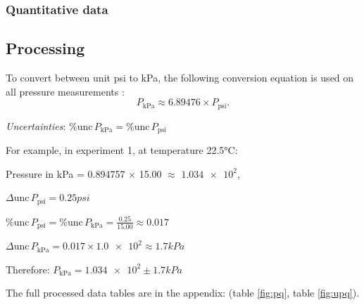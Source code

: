\documentclass[a4paper,12pt]{article}
\newcommand{\absun}{\Delta \text{unc}\,}
\newcommand{\relun}{\% \text{unc}\,}
\begin{document}
\subsubsection*{Quantitative data}
\begin{figure}[H]
    \centering
\end{figure}

\subsection{Processing}
To convert between unit psi to kPa, the following conversion equation is used on all pressure measurements \parencite{conver_units}:
\[
    P_{\text{kPa}} \approx 6.89476 \times P_{\text{psi}}.
\]

\textit{Uncertainties}: $\relun P_{\text{kPa}} = \relun P_{\text{psi}}$

\newpage
For example, in experiment 1, at temperature 22.5$\si{\celsius}$:

Pressure in kPa = 0.894757 $\times$ 15.00 $\approx$ $\num{1.034e+2}$,

$\absun P_{\text{psi}} = 0.25\si{psi}$

$\relun P_{\text{psi}} = \relun P_{\text{kPa}} =  \frac{0.25}{15.00} \approx 0.017$

$\absun P_{\text{kPa}} = 0.017 \times \num{1.0e+2} \approx \num{1.7} \si{kPa}$

Therefore: $P_{\text{kPa}} = \num{1.034e+2} \pm \num{1.7} \si{kPa}$

The full processed data tables are in the appendix: (table \ref{fig:pq}, table \ref{fig:upq}).
\end{document}
